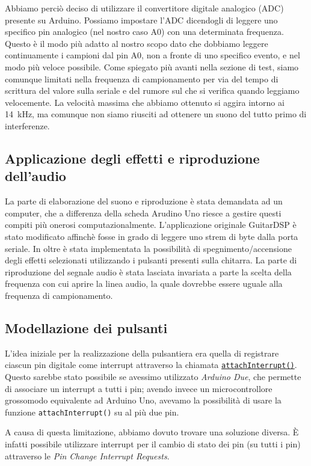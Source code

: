 \documentclass[a4paper,11pt]{article}
\begin{document}
Abbiamo perciò deciso di utilizzare il convertitore digitale analogico (ADC) presente su Arduino. Possiamo impostare l'ADC dicendogli di leggere uno specifico pin analogico (nel nostro caso A0) con una determinata frequenza. Questo è il modo più adatto al nostro scopo dato che dobbiamo leggere continuamente i campioni dal pin A0, non a fronte di uno specifico evento, e nel modo più veloce possibile.
Come spiegato più avanti nella sezione di test, siamo comunque limitati nella frequenza di campionamento per via del tempo di scrittura del valore sulla seriale e del rumore sul che si verifica quando leggiamo velocemente. La velocità massima che abbiamo ottenuto si aggira intorno ai \SI{14}{\kilo\hertz}, ma comunque non siamo riusciti ad ottenere un suono del tutto primo di interferenze.

\subsection{Applicazione degli effetti e riproduzione dell'audio}
La parte di elaborazione del suono e riproduzione è stata demandata ad un computer, che a differenza della scheda Arudino Uno riesce a gestire questi compiti più onerosi computazionalmente. L'applicazione originale GuitarDSP è stato modificato affinchè fosse in grado di leggere uno strem di byte dalla porta seriale. In oltre è stata implementata la possibilità di spegnimento/accensione degli effetti selezionati utilizzando i pulsanti presenti sulla chitarra. La parte di riproduzione del segnale audio è stata lasciata invariata a parte la scelta della frequenza con cui aprire la linea audio, la quale dovrebbe essere uguale alla frequenza di campionamento.

\subsection{Modellazione dei pulsanti}
L'idea iniziale per la realizzazione della pulsantiera era quella di registrare ciascun pin digitale come interrupt attraverso la chiamata \href{http://www.arduino.cc/en/Reference/AttachInterrupt}{\texttt{attachInterrupt()}}. Questo sarebbe stato possibile se avessimo utilizzato \emph{Arduino Due}, che permette di associare un interrupt a tutti i pin; avendo invece un microcontrollore grossomodo equivalente ad Arduino Uno, avevamo la possibilità di usare la funzione \texttt{attachInterrupt()} su al più due pin.

A causa di questa limitazione, abbiamo dovuto trovare una soluzione diversa. È infatti possibile utilizzare interrupt per il cambio di stato dei pin (su tutti i pin) attraverso le \emph{Pin Change Interrupt Requests}\cite{allinterrupts}.
\end{document}
